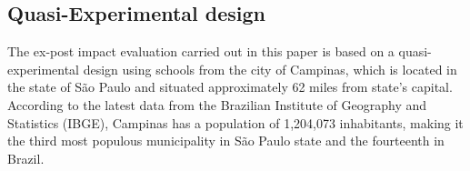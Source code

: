 \documentclass[a4paper, 12pt]{article}
\begin{document}

















\subsection{Quasi-Experimental design} \label{Design}

The ex-post impact evaluation carried out in this paper is based on a quasi-experimental design using schools from the city of Campinas, which is located in the state of São Paulo and situated approximately 62 miles from state’s capital. According to the latest data from the Brazilian Institute of Geography and Statistics (IBGE), Campinas has a population of 1,204,073 inhabitants, making it the third most populous municipality in São Paulo state and the fourteenth in Brazil. 
\end{document}
